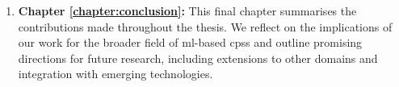 \begin{enumerate}
 \item \textbf{Chapter \ref{chapter:conclusion}:} This final chapter summarises the contributions made throughout the thesis. We reflect on the implications of our work for the broader field of \gls{ml}-based \glspl{cps} and outline promising directions for future research, including extensions to other domains and integration with emerging technologies.
\end{enumerate}


